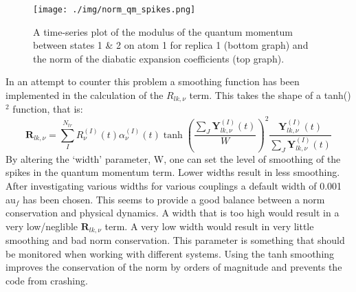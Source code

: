 \begin{figure}[H]
  \texttt{[image: ./img/norm\_qm\_spikes.png]}
  \caption{\label{fig:norm_spikes} A time-series plot of the modulus of the quantum momentum between states 1 \& 2 on atom 1 for replica 1 (bottom graph) and the norm of the diabatic expansion coefficients (top graph). }
\end{figure}
\noindent In an attempt to counter this problem a smoothing function has been implemented in the calculation of the $R_{lk, \nu}$ term. This takes the shape of a tanh()$^2$ function, that is:
\begin{equation}
  \textbf{R}_{lk, \nu} = \sum_{I}^{N_{tr}} R_{\nu}^{(I)}(t) \alpha_{\nu}^{(I)}(t) \tanh\left(\frac{\sum_{J} \textbf{Y}^{(I)}_{lk, \nu}(t)}{W}\right)^2 \frac{\textbf{Y}^{(I)}_{lk, \nu}(t)}{\sum_{J} \textbf{Y}^{(I)}_{lk, \nu}(t)}
  \label{eq:tanh_smooth}
\end{equation}
By altering the `width' parameter, W, one can set the level of smoothing of the spikes in the quantum momentum term. Lower widths result in less smoothing. After investigating various widths for various couplings a default width of 0.001 au$_f$ has been chosen.
This seems to provide a good balance between a norm conservation and physical dynamics. A width that is too high would result in a very low/neglible $\textbf{R}_{lk,\nu}$ term. A very low width would result in very little smoothing and bad norm conservation. This parameter is something that should be monitored when working with different systems.
Using the tanh smoothing improves the conservation of the norm by orders of magnitude and prevents the code from crashing.




